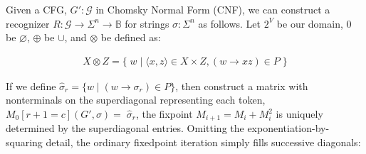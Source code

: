 \documentclass[sigplan,review,acmsmall,nonacm,screen,anonymous]{acmart}\settopmatter{printfolios=false,printccs=false,printacmref=false}
\begin{document}
Given a CFG, $G' : \mathcal{G}$ in Chomsky Normal Form (CNF), we can construct a recognizer $R: \mathcal{G} \rightarrow \Sigma^n \rightarrow \mathbb{B}$ for strings $\sigma: \Sigma^n$ as follows. Let $2^V$ be our domain, $0$ be $\varnothing$, $\oplus$ be $\cup$, and $\otimes$ be defined as:\vspace{-10pt}

\begin{align}
  X \otimes Z = \big\{\;w \mid \langle x, z\rangle \in X \times Z, (w\rightarrow xz) \in P\;\big\}
\end{align}

\noindent If we define $\hat\sigma_r = \{w \mid (w \rightarrow \sigma_r) \in P\}$, then construct a matrix with nonterminals on the superdiagonal representing each token, $M_0[r+1=c](G', \sigma) = \;\hat\sigma_r$, the fixpoint $M_{i+1} = M_i + M_i^2$ is uniquely determined by the superdiagonal entries. Omitting the exponentiation-by-squaring detail, the ordinary fixedpoint iteration simply fills successive diagonals:\vspace{-10pt}
\end{document}
